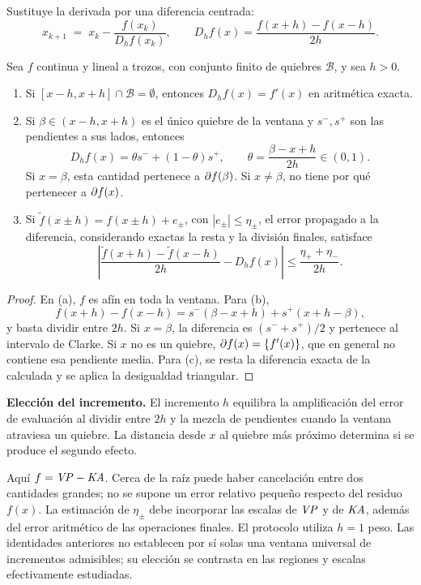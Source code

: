 Sustituye la derivada por una diferencia centrada:
\begin{equation}
\label{eq:newton-fd}
  x_{k+1} \;=\; x_k - \frac{f(x_k)}{D_h f(x_k)},
  \qquad
  D_hf(x)=\frac{f(x+h)-f(x-h)}{2h} .
\end{equation}

\begin{proposition}
\label{prop:sesgo-diferencias}
Sea $f$ continua y lineal a trozos, con conjunto finito de quiebres
$\mathcal B$, y sea $h>0$.
\begin{enumerate}[label=(\alph*),leftmargin=*]
  \item Si $[x-h,x+h]\cap\mathcal B=\emptyset$, entonces
        $D_hf(x)=f'(x)$ en aritmética exacta.
  \item Si $\beta\in(x-h,x+h)$ es el único quiebre de la ventana y
        $s^-,s^+$ son las pendientes a sus lados, entonces
        \[
          D_hf(x)=\theta s^-+(1-\theta)s^+,
          \qquad \theta=\frac{\beta-x+h}{2h}\in(0,1).
        \]
        Si $x=\beta$, esta cantidad pertenece a $\partial f(\beta)$.
        Si $x\ne\beta$, no tiene por qué pertenecer a $\partial f(x)$.
  \item Si $\widetilde f(x\pm h)=f(x\pm h)+e_\pm$, con
        $|e_\pm|\le\eta_\pm$, el error propagado a la diferencia,
        considerando exactas la resta y la división finales, satisface
        \[
          \left|\frac{\widetilde f(x+h)-\widetilde f(x-h)}{2h}
                 -D_hf(x)\right|
          \le\frac{\eta_++\eta_-}{2h}.
        \]
\end{enumerate}
\end{proposition}
\begin{proof}
En (a), $f$ es afín en toda la ventana. Para (b),
\[
 f(x+h)-f(x-h)=s^-(\beta-x+h)+s^+(x+h-\beta),
\]
y basta dividir entre $2h$. Si $x=\beta$, la diferencia es
$(s^-+s^+)/2$ y pertenece al intervalo de Clarke. Si $x$ no es un quiebre,
$\partial f(x)=\{f'(x)\}$, que en general no contiene esa pendiente media.
Para (c), se resta la diferencia exacta de la calculada y se aplica
la desigualdad triangular.
\end{proof}

\begin{aporte}
\textbf{Elección del incremento.} El incremento $h$ equilibra la amplificación
del error de evaluación al dividir entre $2h$ y la mezcla de pendientes cuando
la ventana atraviesa un quiebre. La distancia desde $x$ al quiebre más próximo
determina si se produce el segundo efecto.

Aquí $f=\mathit{VP}-\mathit{KA}$. Cerca de la raíz puede haber cancelación entre dos cantidades
grandes; no se supone un error relativo pequeño respecto del residuo $f(x)$.
La estimación de $\eta_\pm$ debe incorporar las escalas de $\mathit{VP}$ y de $\mathit{KA}$,
además del error aritmético de las operaciones finales. El protocolo utiliza
$h=1$ peso. Las identidades anteriores no establecen por sí solas una ventana
universal de incrementos admisibles; su elección se contrasta en las regiones
y escalas efectivamente estudiadas.
\end{aporte}

